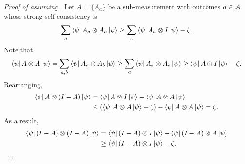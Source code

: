 \begin{proof}[Proof of  assuming ]
Let $A = \{A_a\}$ be a sub-measurement with outcomes $a \in \mathcal{A}$ whose strong self-consistency is
\begin{equation*}
\sum_a \bra{\psi} A_a \otimes A_a \ket{\psi} \geq \sum_a \bra{\psi} A_a \otimes I \ket{\psi} -\zeta.
\end{equation*}
Note that
\begin{equation*}
\bra{\psi} A \otimes A \ket{\psi}
= \sum_{a, b} \bra{\psi} A_a \otimes A_b \ket{\psi}
\geq \sum_{a} \bra{\psi} A_a \otimes A_a \ket{\psi}
\geq  \bra{\psi} A \otimes I \ket{\psi} -\zeta.
\end{equation*}
Rearranging,
\begin{align*}
\bra{\psi} A \otimes (I - A)\ket{\psi}
&= \bra{\psi} A \otimes I \ket{\psi} - \bra{\psi} A \otimes A \ket{\psi}\\
&\leq (\bra{\psi} A \otimes A \ket{\psi} + \zeta) - \bra{\psi} A \otimes A \ket{\psi}
 = \zeta.
\end{align*}
As a result,
\begin{align*}
\bra{\psi} (I-A) \otimes (I-A) \ket{\psi}
&= \bra{\psi} (I-A) \otimes I \ket{\psi} - \bra{\psi} (I-A) \otimes A \ket{\psi}\\
&\geq \bra{\psi} (I-A) \otimes I \ket{\psi} - \zeta.
\end{align*}



\end{proof}
